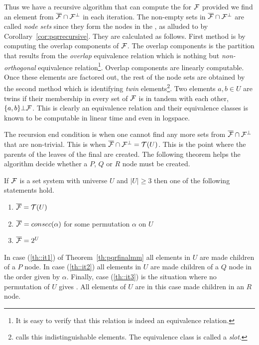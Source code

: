 Thus we have a recursive algorithm that can compute the \PQRtree for
${\cal F}$ provided we find an element from $\overline{{\cal F}} \cap {\cal F}^{\bot}$ in each iteration. The
non-empty sets in $\overline{{\cal F}} \cap {\cal F}^{\bot}$ are called {\em node sets} since they form the
nodes in the \PQRtree, as alluded to by
Corollary~\ref{cor:pqrrecursive}. They are calculated as follows.
First method is by computing the overlap components of ${\cal F}$. The
overlap components is the partition that results from the {\em
  overlap} equivalence relation which is nothing but {\em
  non-orthogonal} equivalence relation\footnote{It is easy to verify
  that this relation is indeed an equivalence relation.}. Overlap
components are linearly computable\cite{mm95,wlh92}. Once these
elements are factored out, the rest of the node sets are obtained by
the second method which is identifying {\em twin}
elements\footnote{\cite[Sec.~3]{kklv10} calls this {indistinguishable}
  elements. The equivalence class is called a {\em slot}.}. Two
elements $a, b \in U$ are twins if their membership in every set of
${\cal F}$ is in tandem with each other, \ie $\{a,b\} \bot {\cal F}$. This is
clearly an equivalence relation and their equivalence classes is known
to be computable in linear time\cite{wlh01,mm96-ref11} and even in
logspace\cite{kklv10}.

The recursion end condition is when one cannot find any more sets from
$\overline{{\cal F}} \cap {\cal F}^{\bot}$ that are non-trivial. This is when $\overline{{\cal F}} \cap {\cal F}^{\bot} = {\cal T}(U)$. This is the
point where the parents of the leaves of the final \PQRtree are created. The
following theorem helps the algorithm decide whether a $P$, $Q$ or
$R$ node must be created.

\begin{theoremsansproof}[{\cite[Th.~9]{mm96}}] %
\label{th:pqrfinalmm}
If ${\cal F}$ is a set system with universe $U$ and $|U| \ge 3$ then one of
the following statements hold.
\begin{enumerate}
\item \label{th::it1} $\overline{{\cal F}} = {\cal T}(U)$ 
\item \label{th::it2}$\overline{{\cal F}} = consec(\alpha)$ for
  some permutation $\alpha$ on $U$ 
\item \label{th::it3}$\overline{{\cal F}} = 2^{U}$ 
\end{enumerate}
\end{theoremsansproof}

In case (\ref{th::it1}) of Theorem~\ref{th:pqrfinalmm} all elements in
$U$ are made children of a $P$ node. In case (\ref{th::it2}) all
elements in $U$ are made children of a $Q$ node in the order given by
$\alpha$. Finally, case (\ref{th::it3}) is the situation where no permutation
of $U$ gives \COP. All elements of $U$ are in this case made children
in an $R$ node.

